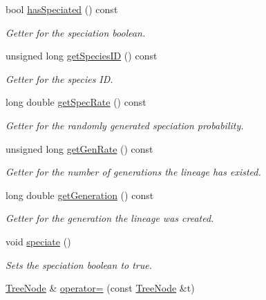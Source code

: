 \begin{DoxyCompactItemize}
bool \hyperlink{class_tree_node_ad1f55fc63a25d6bf12e3bb6bc6034a3b}{has\+Speciated} () const 
\begin{DoxyCompactList}\small\item\em Getter for the speciation boolean. \end{DoxyCompactList}\item 
unsigned long \hyperlink{class_tree_node_a9278669eb6ae607bc89278ff104075e3}{get\+Species\+ID} () const 
\begin{DoxyCompactList}\small\item\em Getter for the species ID. \end{DoxyCompactList}\item 
long double \hyperlink{class_tree_node_a453643b70ee5e0c1f574bb25294b4807}{get\+Spec\+Rate} () const 
\begin{DoxyCompactList}\small\item\em Getter for the randomly generated speciation probability. \end{DoxyCompactList}\item 
unsigned long \hyperlink{class_tree_node_a5f061a52d2b78908baebafae58e91e1d}{get\+Gen\+Rate} () const 
\begin{DoxyCompactList}\small\item\em Getter for the number of generations the lineage has existed. \end{DoxyCompactList}\item 
long double \hyperlink{class_tree_node_aacd1303b7b5481fb4b8a0f0481e45a50}{get\+Generation} () const 
\begin{DoxyCompactList}\small\item\em Getter for the generation the lineage was created. \end{DoxyCompactList}\item 
void \hyperlink{class_tree_node_a65a021122e06071f6f127be3a0171518}{speciate} ()\hypertarget{class_tree_node_a65a021122e06071f6f127be3a0171518}{}\label{class_tree_node_a65a021122e06071f6f127be3a0171518}

\begin{DoxyCompactList}\small\item\em Sets the speciation boolean to true. \end{DoxyCompactList}\item 
\hyperlink{class_tree_node}{Tree\+Node} \& \hyperlink{class_tree_node_af362bf557fa6af455f6bac31c4f0356a}{operator=} (const \hyperlink{class_tree_node}{Tree\+Node} \&t)
\end{DoxyCompactItemize}
